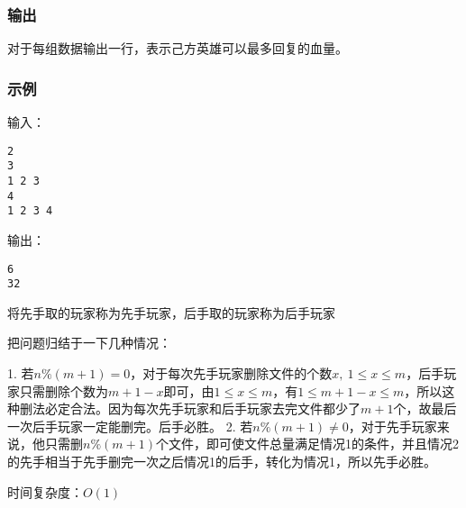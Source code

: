 \subsubsection{输出}
对于每组数据输出一行，表示己方英雄可以最多回复的血量。

\subsubsection{示例}
输入：
\begin{lstlisting}
2
3
1 2 3
4
1 2 3 4
\end{lstlisting}

输出：
\begin{lstlisting}
6
32
\end{lstlisting}

将先手取的玩家称为先手玩家，后手取的玩家称为后手玩家

把问题归结于一下几种情况：

1. 若$n \% (m + 1) =0$，对于每次先手玩家删除文件的个数$x, \ 1 \leq x \leq m$，后手玩家只需删除个数为$m + 1 -x$即可，由$1 \leq x \leq m$，有$1 \leq m + 1 - x \leq m$，所以这种删法必定合法。因为每次先手玩家和后手玩家去完文件都少了$m + 1$个，故最后一次后手玩家一定能删完。后手必胜。
2. 若$n \% (m + 1) \neq 0$，对于先手玩家来说，他只需删$n \% (m + 1)$个文件，即可使文件总量满足情况1的条件，并且情况2的先手相当于先手删完一次之后情况1的后手，转化为情况1，所以先手必胜。

时间复杂度：$O(1)$
